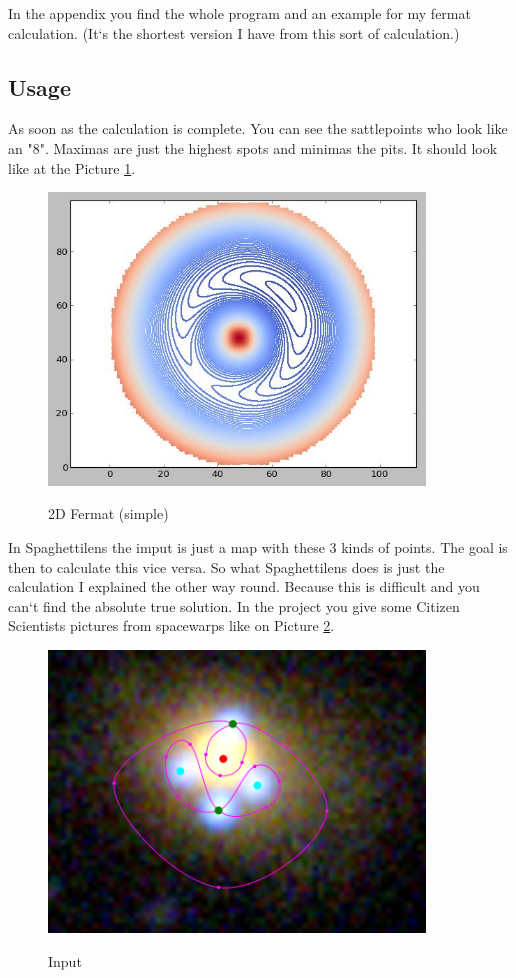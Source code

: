 \documentclass[pdftex,12pt,a4paper]{article}
\begin{document}
In the appendix you find the whole program and an example for my fermat calculation. (It`s the shortest version I have from this sort of calculation.)

\subsection{Usage}

As soon as the calculation is complete. You can see the sattlepoints who look like an "8". Maximas are just the highest spots and minimas the pits. It should look like at the Picture \ref{Bild}.


\begin{figure}
\centering
 \caption{2D Fermat (simple)}
 \includegraphics[width=10cm]{Bilder/simpl}%
\label{Bild}
\end{figure}


In Spaghettilens the imput is just a map with these 3 kinds of points. The goal is then to calculate this vice versa. So what Spaghettilens does is just the calculation I explained the other way round. Because this is difficult and you can`t find the absolute true solution. In the project you give some Citizen Scientists pictures from spacewarps like on Picture \ref{Bild2}.

\begin{figure}
\centering
 \caption{Input}
 \includegraphics[width=10cm]{Bilder/workinput}%
\label{Bild2}
\end{figure}
\end{document}
